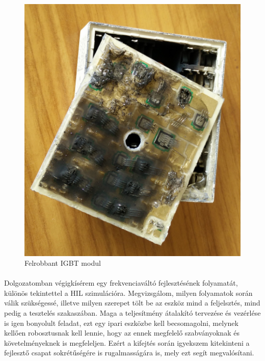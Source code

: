 \begin{figure}[h]
	\centering
	\includegraphics[scale = 0.1]{figures/IMG_20160415_134241.jpg}
	\caption{Felrobbant IGBT modul} 
	\label{fig:blown}
\end{figure}

\paragraph{}
Dolgozatomban végigkísérem egy frekvenciaváltó fejlesztésének folyamatát, különös tekintettel a HIL szimulációra. Megvizsgálom, milyen folyamatok során válik szükségessé, illetve milyen szerepet tölt be az eszköz mind a feljelsztés, mind pedig a tesztelés szakaszában. Maga a teljesítmény átalakító tervezése és vezérlése is igen bonyolult feladat, ezt egy ipari eszközbe kell becsomagolni, melynek kellően robosztusnak kell lennie, hogy az ennek megfelelő szabványoknak és követelményeknek is megfeleljen. Ezért a kifejtés során igyekszem kitekinteni a fejlesztő csapat sokrétűségére is rugalmasságára is, mely ezt segít megvalósítani.
